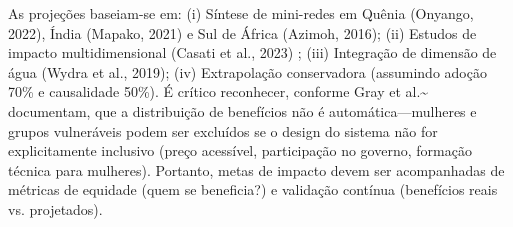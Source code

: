 \documentclass[12pt, a4paper]{article}
\begin{document}
\begin{table}[H]
\centering
\caption{Impacto Social Estimado em Cacula (1 Ano Pós-Implementação)}
\label{Tab:4}
\label{tab:cacula_impact}
\small
{}
\end{table}

As projeções baseiam-se em: (i) Síntese de mini-redes em Quênia (Onyango, 2022), Índia (Mapako, 2021) e Sul de África (Azimoh, 2016); (ii) Estudos de impacto multidimensional (Casati et al., 2023) ; (iii) Integração de dimensão de água (Wydra et al., 2019); (iv) Extrapolação conservadora (assumindo adoção 70\% e causalidade 50\%).  É crítico reconhecer, conforme Gray et al.\textasciitilde{}\citep{Gray2019} documentam, que a distribuição de benefícios não é automática—mulheres e grupos vulneráveis podem ser excluídos se o design do sistema não for explicitamente inclusivo (preço acessível, participação no governo, formação técnica para mulheres). Portanto, metas de impacto devem ser acompanhadas de métricas de equidade (quem se beneficia?) e validação contínua (benefícios reais vs. projetados).
\end{document}
